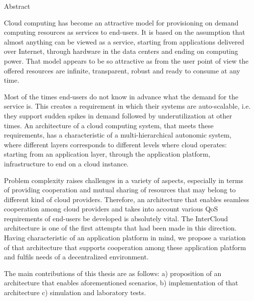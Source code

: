 \vspace*{0.5cm}

\begin{center}
  \LARGE Abstract
\end{center}

Cloud computing has become an attractive model for provisioning on demand computing resources as services to end-users. It is based on the assumption that almost anything can be viewed as a service, starting from applications delivered over Internet, through hardware in the data centers and ending on computing power. That model appears to be so attractive as from the user point of view the offered resources are infinite, transparent, robust and ready to consume at any time.

Most of the times end-users do not know in advance what the demand for the service is. This creates a requirement in which their systems are auto-scalable, i.e. they support sudden spikes in demand followed by underutilization at other times. An architecture of a cloud computing system, that meets these requirements, has a characteristic of a multi-hierarchical autonomic system, where different layers corresponds to different levels where cloud operates: starting from an application layer, through the application platform, infrastructure to end on a cloud instance.

Problem complexity raises challenges in a variety of aspects, especially in terms of providing cooperation and mutual sharing of resources that may belong to different kind of cloud providers. Therefore, an architecture that enables seamless cooperation among cloud providers and takes into account various QoS requirements of end-users be developed is absolutely vital. The InterCloud architecture is one of the first attempts that had been made in this direction. Having characteristic of an application platform in mind, we propose a variation of that architecture that supports cooperation among these application platform and fulfils needs of a decentralized environment.

The main contributions of this thesis are as follows: a) proposition of an architecture that enables aforementioned scenarios, b) implementation of that architecture c) simulation and laboratory tests.


